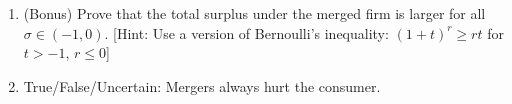 \documentclass[11pt]{article}
\begin{document}
\begin{enumerate}
    \item (Bonus) Prove that the total surplus under the merged firm is larger for all $\sigma \in (-1,0)$. 
    [Hint: Use a version of Bernoulli's inequality: $(1+t)^r \ge rt$ for $t > -1$, $r \le 0$] 
    \item True/False/Uncertain: Mergers always hurt the consumer.
\end{enumerate}
\end{document}
